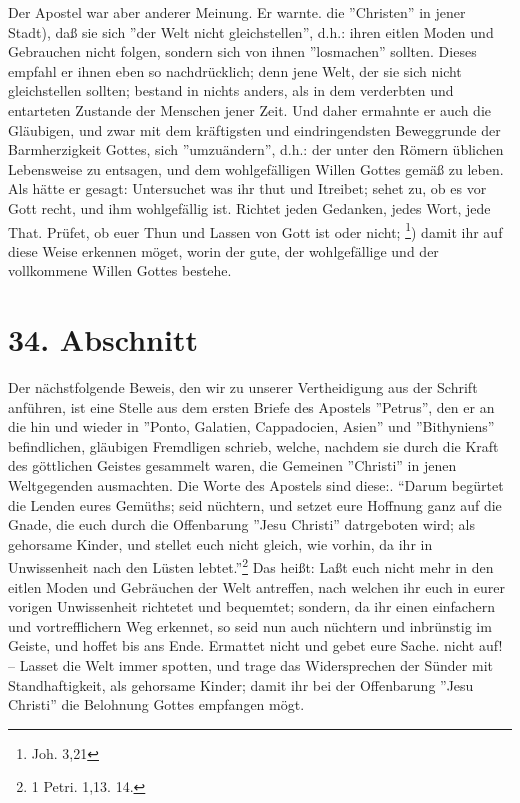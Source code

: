 Der Apostel war aber anderer Meinung. Er warnte. die ''Christen'' in jener Stadt), daß sie sich ''der Welt nicht gleichstellen'', d.h.: ihren eitlen Moden und Gebrauchen nicht folgen, sondern sich von ihnen ''losmachen'' sollten. Dieses empfahl er ihnen eben so nachdrücklich; denn jene Welt, der sie sich nicht gleichstellen sollten; bestand in nichts anders, als in dem verderbten und entarteten Zustande der Menschen jener Zeit. Und daher ermahnte er auch die Gläubigen, und zwar mit dem kräftigsten und eindringendsten Beweggrunde der Barmherzigkeit Gottes, sich ''umzuändern'', d.h.: der unter den Römern üblichen Lebensweise zu entsagen, und dem wohlgefälligen Willen Gottes gemäß zu leben. Als hätte er gesagt: Untersuchet was ihr thut und Itreibet; sehet zu, ob es vor Gott recht, und ihm wohlgefällig ist. Richtet jeden Gedanken, jedes Wort, jede That. Prüfet, ob euer Thun und Lassen von Gott ist oder nicht; \footnote{Joh. 3,21}) damit ihr auf diese Weise erkennen möget, worin der gute, der wohlgefällige und der vollkommene Willen Gottes bestehe.

\section{34. Abschnitt}

Der nächstfolgende Beweis, den wir zu unserer Vertheidigung aus der Schrift anführen, ist eine Stelle aus dem ersten Briefe des Apostels ''Petrus'', den er an die hin und wieder in ''Ponto, Galatien, Cappadocien, Asien'' und ''Bithyniens'' befindlichen, gläubigen Fremdligen schrieb, welche, nachdem sie durch die Kraft des göttlichen Geistes gesammelt waren, die Gemeinen ''Christi'' in jenen Weltgegenden ausmachten. Die Worte des Apostels sind diese:. "`Darum begürtet die Lenden eures Gemüths; seid nüchtern, und setzet eure Hoffnung ganz auf die Gnade, die euch durch die Offenbarung ''Jesu Christi'' datrgeboten wird; als gehorsame Kinder, und stellet euch nicht gleich, wie vorhin, da ihr in Unwissenheit nach den Lüsten lebtet."'\footnote{1 Petri. 1,13. 14.} Das heißt: Laßt euch nicht mehr in den eitlen Moden und Gebräuchen der Welt antreffen, nach welchen ihr euch in eurer vorigen Unwissenheit richtetet und bequemtet; sondern, da ihr einen einfachern und vortrefflichern Weg erkennet, so seid nun auch nüchtern und inbrünstig im Geiste, und hoffet bis ans Ende. Ermattet nicht und gebet eure Sache. nicht auf! -- Lasset die Welt immer spotten, und trage das Widersprechen der Sünder mit Standhaftigkeit, als gehorsame Kinder; damit ihr bei der Offenbarung ''Jesu Christi'' die Belohnung Gottes empfangen mögt.


